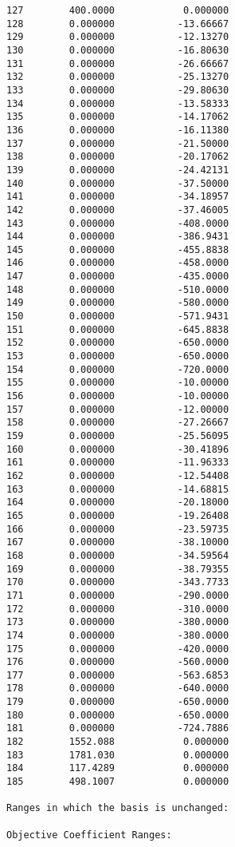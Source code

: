 \documentclass[12pt]{article}
\begin{document}
\begin{appendices}
\begin{lstlisting}
127        400.0000            0.000000
128        0.000000           -13.66667
129        0.000000           -12.13270
130        0.000000           -16.80630
131        0.000000           -26.66667
132        0.000000           -25.13270
133        0.000000           -29.80630
134        0.000000           -13.58333
135        0.000000           -14.17062
136        0.000000           -16.11380
137        0.000000           -21.50000
138        0.000000           -20.17062
139        0.000000           -24.42131
140        0.000000           -37.50000
141        0.000000           -34.18957
142        0.000000           -37.46005
143        0.000000           -408.0000
144        0.000000           -386.9431
145        0.000000           -455.8838
146        0.000000           -458.0000
147        0.000000           -435.0000
148        0.000000           -510.0000
149        0.000000           -580.0000
150        0.000000           -571.9431
151        0.000000           -645.8838
152        0.000000           -650.0000
153        0.000000           -650.0000
154        0.000000           -720.0000
155        0.000000           -10.00000
156        0.000000           -10.00000
157        0.000000           -12.00000
158        0.000000           -27.26667
159        0.000000           -25.56095
160        0.000000           -30.41896
161        0.000000           -11.96333
162        0.000000           -12.54408
163        0.000000           -14.68815
164        0.000000           -20.18000
165        0.000000           -19.26408
166        0.000000           -23.59735
167        0.000000           -38.10000
168        0.000000           -34.59564
169        0.000000           -38.79355
170        0.000000           -343.7733
171        0.000000           -290.0000
172        0.000000           -310.0000
173        0.000000           -380.0000
174        0.000000           -380.0000
175        0.000000           -420.0000
176        0.000000           -560.0000
177        0.000000           -563.6853
178        0.000000           -640.0000
179        0.000000           -650.0000
180        0.000000           -650.0000
181        0.000000           -724.7886
182        1552.088            0.000000
183        1781.030            0.000000
184        117.4289            0.000000
185        498.1007            0.000000

Ranges in which the basis is unchanged:

Objective Coefficient Ranges:


\end{lstlisting}
\end{appendices}
\end{document}
